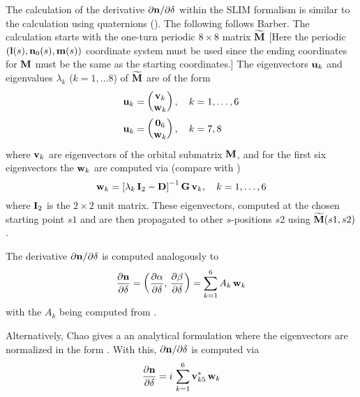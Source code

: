 The calculation of the derivative ${\partial{\bf n}}/\partial\delta$ within the SLIM formalism is
similar to the calculation using quaternions (). The following follows
Barber\cite{b:barber99}. The calculation starts with the one-turn periodic $8 \times 8$ matrix
$\widetilde {{\bf M}}$ [Here the periodic $({\bf l}(s), {\bf n}_0(s), {\bf m}(s))$ coordinate system must be used
since the ending coordinates for ${\bf M}$ must be the same as the starting coordinates.]  The
eigenvectors ${\bf u}_k$ and eigenvalues $\lambda_k$ ($k = 1, \ldots 8$) of $\widetilde {{\bf M}}$ are of
the form
\begin{align}
  {\bf u}_k &= \begin{pmatrix} {\bf v}_k \\ {\bf w}_k \end{pmatrix}, \quad k = 1, \ldots, 6
  \label{qvw} \\
  {\bf u}_k &= \begin{pmatrix} {\bf 0}_6 \\ {\bf w}_k \end{pmatrix}, \quad k = 7, 8 \nonumber
\end{align}
where ${\bf v}_k$ are eigenvectors of the orbital submatrix ${\bf M}$, and for the first six eigenvectors
the ${\bf w}_k$ are computed via (compare with )
\begin{equation}
  {\bf w}_k = \left[ \lambda_k \, {\bf I}_2 - {\bf D} \right]^{-1} {\bf G} \, {\bf v}_k, \quad k = 1, \ldots, 6
  \label{wdlgv}
\end{equation}
where ${\bf I}_2$ is the $2 \times 2$ unit matrix. These eigenvectors, computed at the chosen starting
point $s1$ and are then propagated to other $s$-positions $s2$ using ${\widetilde {{\bf M}}}(s1, s2)$.

The derivative ${\partial {\bf n}}/\partial \delta$ is computed analogously to 
\begin{equation}
  \frac{\partial {\bf n}}{\partial \delta} = 
  \left( \frac{\partial \alpha}{\partial \delta}, \, \frac{\partial \beta}{\partial \delta} \right) = 
  \sum_{k = 1}^6 A_k \, {\bf w}_k
  \label{ndaw}
\end{equation}
with the $A_k$ being computed from .

Alternatively, Chao \cite{b:chao79} gives a an analytical formulation where the eigenvectors are
normalized in the form .  With this, ${\partial {\bf n}}/{\partial \delta}$ is computed via
\begin{equation}
  \frac{\partial {\bf n}}{\partial \delta} = i \, \sum_{k = 1}^6 {\bf v}_{k5}^* \, {\bf w}_k
  \label{ndivw}
\end{equation}

